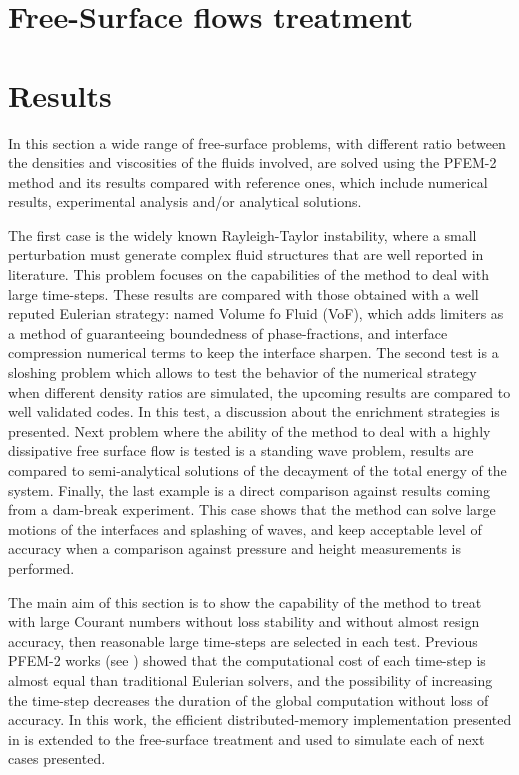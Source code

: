 \documentclass[review]{elsarticle}
\begin{document}
\section[Free-Surface treatment]{Free-Surface flows treatment}\label{Free_surface}



% 

\section{Results}\label{FS_results}

In this section a wide range of free-surface problems, with different ratio between the densities and viscosities of the fluids involved, are solved using the PFEM-2 method and its results compared with reference ones, which include numerical results, experimental analysis and/or analytical solutions.

The first case is the widely known Rayleigh-Taylor instability, where a small perturbation must generate complex fluid structures that are well reported in literature.
This problem focuses on the capabilities of the method to deal with large time-steps. These results are compared with those obtained with a well reputed Eulerian strategy: named Volume fo Fluid (VoF), which adds limiters as a method of guaranteeing boundedness of phase-fractions, and interface compression numerical terms to keep the interface sharpen.
The second test is a sloshing problem which allows to test the behavior of the numerical strategy when different density ratios are simulated, the upcoming results are compared to well validated codes. In this test, a discussion about the enrichment strategies is presented. Next problem where the ability of the method to deal with a highly dissipative free surface flow is tested is a standing wave problem, results are compared to semi-analytical solutions of the decayment of the total energy of the system.
Finally, the last example is a direct comparison against results coming from a dam-break experiment.
This case shows that the method can solve large motions of the interfaces and splashing of waves, and keep acceptable level of accuracy when a comparison against pressure and height measurements is performed.

The main aim of this section is to show the capability of the method to treat with large Courant numbers without loss stability and without almost resign accuracy, then reasonable large time-steps are selected in each test. Previous PFEM-2 works (see \cite{Idelsohn12b}\cite{Gimenez14}) showed that the computational cost of each time-step is almost equal than traditional Eulerian solvers, and the possibility of increasing the time-step decreases the duration of the global computation without loss of accuracy. In this work, the efficient distributed-memory implementation presented in \cite{Gimenez14} is extended to the free-surface treatment and used to simulate each of next cases presented.
 
\end{document}
